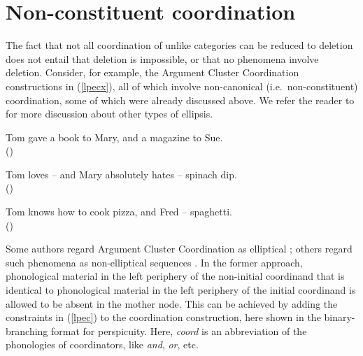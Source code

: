 \section{Non-constituent coordination}
\label{sec-non-constituent-coordination}

The fact that not all coordination of unlike categories can be reduced to deletion  does not entail that
deletion is impossible, or that no phenomena involve deletion.
Consider, for example, the Argument Cluster Coordination constructions in (\ref{lpecx}), all of which 
involve non-canonical (i.e.\ non-constituent) coordination, 
some of which were already discussed above. We refer the reader to  for more discussion about other types of ellipsis.

\eal
\label{lpecx}
\ex 
\label{ex-tom-gave-a-book-to-mary-and-a-magazine-to-sue}
Tom gave a book to Mary, and a magazine to Sue.\\
()

\ex Tom loves -- and Mary absolutely hates -- spinach dip.\\
()

\ex Tom knows how to cook pizza, and Fred -- spaghetti.\\
()

\zl

Some authors regard Argument Cluster Coordination as elliptical \citep{yatabe01,Crysmann:04,Beavers}; others
regard such phenomena as non-elliptical sequences \citep{Mouret:06}.
In the former approach,  phonological material in the left periphery of the non-initial coordinand that is identical to
phonological material in the left periphery of the initial coordinand is allowed to be absent in the mother node.
This can be achieved by adding the constraints in (\ref{lpec}) to the coordination construction, here shown in the binary-branching format for perspicuity.
Here, {\it coord} is an abbreviation of the phonologies of coordinators, like
{\it and}, {\it or}, etc.

\ea
\label{lpec}
 \impl\\
\z

